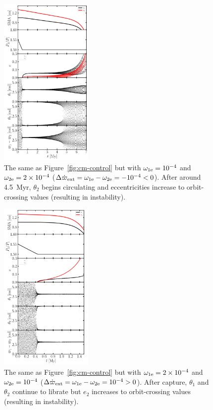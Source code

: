 \documentclass[usenatbib,twocolumn]{mnras}
\begin{document}
\begin{figure}
    \includegraphics[width=0.4\textwidth]{cm_1e-4_2e-4.png}
    \caption{The same as Figure~\ref{fig:cm-control} but with $\omega_{1\rm e}=10^{-4}$ and $\omega_{2\rm e}=2\times10^{-4}$ ($\Delta\dot\varpi_{\rm ext}=\omega_{1\rm e}-\omega_{2\rm e}=-10^{-4}<0$). After around 4.5~Myr, $\theta_2$ begins circulating and eccentricities increase to orbit-crossing values (resulting in instability).}
    \label{fig:cm-neg-dDpom}
\end{figure}

\begin{figure}
    \includegraphics[width=0.4\textwidth]{cm_2e-4_1e-4.png}
    \caption{The same as Figure~\ref{fig:cm-control} but with $\omega_{1\rm e}=2\times10^{-4}$ and $\omega_{2\rm e}=10^{-4}$ ($\Delta\dot\varpi_{\rm ext}=\omega_{1\rm e}-\omega_{2\rm e}=10^{-4}>0$). After capture, $\theta_1$ and $\theta_2$ continue to librate but $e_2$ increases to orbit-crossing values (resulting in instability).
    }
    \label{fig:cm-pos-dDpom}
\end{figure}
\end{document}
